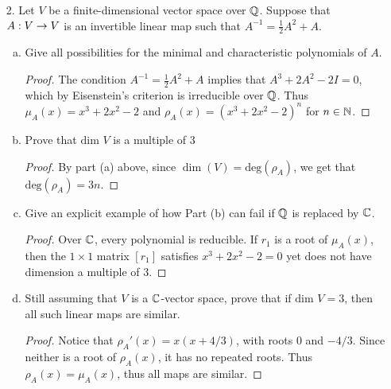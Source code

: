 \begin{itemize}
\begin{enumerate}[(a)]
\begin{enumerate}[(a)]
        \item $\phi(f_i) = P_{\phi(V)} e_i$ for some orthonormal basis $\{e_1, ... , e_m\}$ of $W$, where $P_{\phi(V)}$ is the orthogonal projection onto the subspace $\phi(V)$.
    \end{enumerate}
    \begin{proof}
        ($\Leftarrow$)
        
        \medskip 
        
        ($\Rightarrow$)
    \end{proof}
\end{enumerate}








\item[2.] Let $V$ be a finite-dimensional vector space over $\mathbb{Q}$. Suppose that $A : V \rightarrow V$ is an invertible linear map such that $A^{-1} = \frac{1}{2} A^2 + A$.
\begin{enumerate}[(a)]
    \item Give all possibilities for the minimal and characteristic polynomials of $A$.
    \begin{proof}
    The condition $A^{-1} = \frac{1}{2} A^2 + A$ implies that $A^3 + 2A^2 - 2I = 0$, which by Eisenstein's criterion is irreducible over $\mathbb{Q}$. Thus $\mu_A(x) = x^3 + 2x^2 - 2$ and $\rho_A(x) = (x^3 + 2x^2 - 2)^n$ for $n \in \mathbb{N}$.
    \end{proof}
    
    \item Prove that $\text{dim } V$ is a multiple of 3
    \begin{proof}
    By part (a) above, since $\dim(V) = \text{deg}(\rho_A)$, we get that $\text{deg}(\rho_A) = 3n$.
    \end{proof}
    
    \item Give an explicit example of how Part (b) can fail if $\mathbb{Q}$ is replaced by $\mathbb{C}$.
    \begin{proof}
    Over $\mathbb{C}$, every polynomial is reducible. If $r_1$ is a root of $\mu_A(x)$, then the $1 \times 1$ matrix $[r_1]$ satisfies $x^3 + 2x^2 - 2 = 0$ yet does not have dimension a multiple of 3.
    \end{proof}
    
    \item Still assuming that $V$ is a $\mathbb{C}$-vector space, prove that if $\text{dim } V = 3$, then all such linear maps are similar.
    \begin{proof}
    Notice that $\rho_A'(x) = x(x+4/3)$, with roots $0$ and $-4/3$. Since neither is a root of $\rho_A(x)$, it has no repeated roots. Thus $\rho_A(x) = \mu_A(x)$, thus all maps are similar. 
    \end{proof}
    

\end{enumerate}
\end{itemize}
